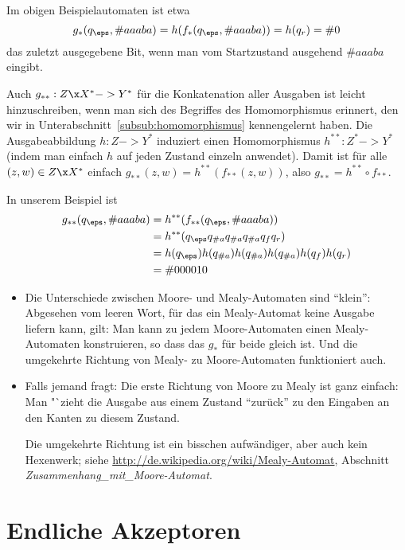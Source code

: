 Im obigen Beispielautomaten ist etwa 
\[
g_*(q_{\eps},\#{aaaba}) = h(f_*(q_{\eps},\#{aaaba}))= h(q_r) = \#0 
\]
das zuletzt ausgegebene Bit, wenn man vom Startzustand ausgehend
$\#{aaaba}$ eingibt.

Auch $g_{**}:Z\x X^* ->Y^*$%
 für die Konkatenation
aller Ausgaben ist leicht hinzuschreiben, wenn man sich des Begriffes
des Homomorphismus erinnert, den wir in
Unterabschnitt~\ref{subsub:homomorphismus} kennengelernt haben.
%
Die Ausgabeabbildung $h:Z-> Y^*$ induziert einen Homomorphismus
$h^{**}:Z^*-> Y^*$ (indem man einfach $h$ auf jeden Zustand einzeln
anwendet). Damit ist für alle
$(z,w)\in Z\x X^*$ einfach $g_{**}(z,w)= h^{**}(f_{**}(z,w))$, also
$g_{**}=h^{**}\circ f_{**}$.

In unserem Beispiel ist
\begin{align*}
g_{**}(q_{\eps},\#{aaaba}) &= h^{**}(f_{**}(q_{\eps},\#{aaaba})) \\
&= h^{**}(q_{\eps}q_{\#a}q_{\#a}q_{\#a}q_fq_r) \\
&= h(q_{\eps})h(q_{\#a})h(q_{\#a})h(q_{\#a})h(q_f)h(q_r) \\
&= \#{000010}
\end{align*}

\begin{extract}[tut]
  \begin{itemize}
  \item Die Unterschiede zwischen Moore- und Mealy-Automaten sind
    "`klein"': Abgesehen vom leeren Wort, für das ein Mealy-Automat
    keine Ausgabe liefern kann, gilt: Man kann zu jedem
    Moore-Automaten einen Mealy-Automaten konstruieren, so dass das
    $g_*$ für beide gleich ist. Und die umgekehrte Richtung von Mealy-
    zu Moore-Automaten funktioniert auch.
    
  \item Falls jemand fragt: Die erste Richtung von Moore zu Mealy ist
    ganz einfach: Man "`zieht die Ausgabe aus einem Zustand "`zurück"'
    zu den Eingaben an den Kanten zu diesem Zustand.

    Die umgekehrte Richtung ist ein bisschen aufwändiger, aber auch
    kein Hexenwerk; siehe
    \url{http://de.wikipedia.org/wiki/Mealy-Automat}, Abschnitt
    \emph{Zusammenhang\_mit\_}\emph{Moore-Automat}.
  \end{itemize}
\end{extract}
\Tut\section{Endliche Akzeptoren}
\label{sec:akzeptoren}

